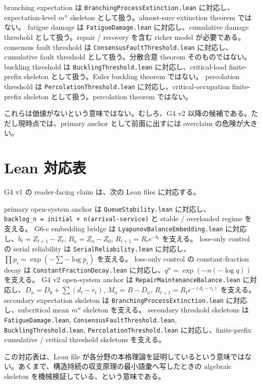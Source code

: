 \documentclass[12pt,a4paper]{article}
\begin{document}
branching expectation は \texttt{BranchingProcessExtinction.lean} に対応し、expectation-level \(m^n\) skeleton として扱う。almost-sure extinction theorem ではない。 fatigue damage は \texttt{FatigueDamage.lean} に対応し、cumulative damage threshold として扱う。repair / recovery を含む richer model が必要である。 consensus fault threshold は \texttt{ConsensusFaultThreshold.lean} に対応し、cumulative fault threshold として扱う。分散合意 theorem そのものではない。 buckling threshold は \texttt{BucklingThreshold.lean} に対応し、critical-load finite-prefix skeleton として扱う。Euler buckling theorem ではない。 percolation threshold は \texttt{PercolationThreshold.lean} に対応し、critical-occupation finite-prefix skeleton として扱う。percolation theorem ではない。

これらは価値がないという意味ではない。むしろ、G4 v2 以降の候補である。ただし現時点では、primary anchor として前面に出すには overclaim の危険が大きい。

\section{Lean 対応表}\label{lean-ux5bfeux5fdcux8868}

G4 v1 の reader-facing claim は、次の Lean files に対応する。

primary open-system anchor は \texttt{QueueStability.lean} に対応し、\texttt{backlog\_n\ =\ initial\ +\ n(arrival-service)} と stable / overloaded regime を支える。 G6-c embedding bridge は \texttt{LyapunovBalanceEmbedding.lean} に対応し、\(b_{t}=Z_{t+1}-Z_{t}\), \(B_{n}=Z_{n}-Z_0\), \(R_{t+1}=R_{t} e^{-b_{t}}\) を支える。 loss-only control の serial reliability は \texttt{SerialReliability.lean} に対応し、\(\prod p_{i} = \exp(-\sum -\log p_{i})\) を支える。 loss-only control の constant-fraction decay は \texttt{ConstantFractionDecay.lean} に対応し、\(q^n=\exp(-n(-\log q))\) を支える。 G4 v2 open-system anchor は \texttt{RepairMaintenanceBalance.lean} に対応し、\(D_{n}=D_0+\sum(d_{t}-r_{t})\), \(M_{n}=B-D_{n}\), \(R_{t+1}=R_{t} e^{-(d_{t}-r_{t})}\) を支える。 secondary expectation skeleton は \texttt{BranchingProcessExtinction.lean} に対応し、subcritical mean \(m^n\) skeleton を支える。 secondary threshold skeletons は \texttt{FatigueDamage.lean}, \texttt{ConsensusFaultThreshold.lean}, \texttt{BucklingThreshold.lean}, \texttt{PercolationThreshold.lean} に対応し、finite-prefix cumulative / critical threshold skeletons を支える。

この対応表は、Lean file が各分野の本格理論を証明しているという意味ではない。あくまで、構造持続の収支原理の最小語彙へ写したときの algebraic skeleton を機械検証している、という意味である。
\end{document}
